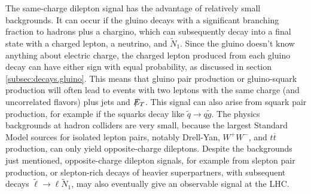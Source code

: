 \documentclass[11pt]{article}
\def\stilde{\widetilde}
\def\NI{\stilde N_1}
\def\Et{{\slashchar{E}_T}}
\def\slashchar#1{\setbox0=\hbox{$#1$}           %
   \dimen0=\wd0                                 %
   \setbox1=\hbox{/} \dimen1=\wd1               %
   \ifdim\dimen0>\dimen1                        %
      \rlap{\hbox to \dimen0{\hfil/\hfil}}      %
      #1                                        %
   \else                                        %
      \rlap{\hbox to \dimen1{\hfil$#1$\hfil}}   %
      /                                         %
   \fi}                                        %
\begin{document}
The same-charge dilepton signal \cite{likesigndilepton} has the advantage 
of relatively small
backgrounds. It can occur if the gluino decays with a 
significant branching fraction to hadrons 
plus a chargino, which can subsequently decay into a final state with a charged lepton, a 
neutrino, and $\stilde N_1$. Since the gluino doesn't know anything about 
electric charge, the 
charged lepton produced from each gluino decay can have either sign with equal 
probability, as discussed in section 
\ref{subsec:decays.gluino}. This means that gluino pair 
production or gluino-squark production will often lead 
to events with two leptons with the same 
charge (and uncorrelated flavors) plus jets and $\Et$. 
This signal can also arise from  squark 
pair production, for example if the squarks decay like 
$\stilde q \rightarrow q\stilde g$. The physics backgrounds at hadron 
colliders are very small, 
because the largest Standard Model sources for isolated lepton pairs, notably Drell-Yan,
$W^+W^-$, and $t\overline t$ production, can only yield opposite-charge dileptons. 
Despite the backgrounds just mentioned, 
opposite-charge dilepton signals, for example from 
slepton pair production, or slepton-rich decays 
of heavier superpartners, with subsequent decays 
$\stilde \ell \rightarrow \ell \NI$, may also eventually 
give an observable signal at the LHC.
\end{document}
